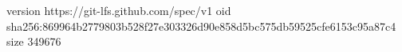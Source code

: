 version https://git-lfs.github.com/spec/v1
oid sha256:869964b2779803b528f27e303326d90e858d5bc575db59525cfe6153c95a87c4
size 349676
